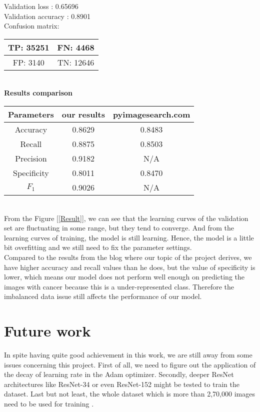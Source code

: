 \documentclass[10 pt]{report}
\begin{document}
\noindent
Validation loss : 0.65696\\
Validation accuracy : 0.8901\\

\noindent
Confusion matrix:\\
\noindent
\begin{tabular}{|c|c|}
\hline
TP: 35251 &  FN: 4468\\ \hline
FP: 3140 & TN: 12646\\ \hline
\end{tabular} \\


\noindent
\textbf{Results comparison}\\
\begin{tabular}{|c|c|c|}
\hline
Parameters & our results & pyimagesearch.com\\ \hline
Accuracy & 0.8629&  0.8483\\ \hline
Recall & 0.8875&  0.8503\\ \hline
Precision  & 0.9182&  N/A\\ \hline
Specificity  & 0.8011&  0.8470\\ \hline
$F_1$  & 0.9026&  N/A\\ \hline
\end{tabular}\\


\vspace{5mm}
\noindent
From the Figure [\ref{Result}],  we can see that the learning curves of the validation set are fluctuating in some range, but they tend to converge. And from the learning curves of training, the model is still learning. Hence, the model is a little bit overfitting and we still need to fix the parameter settings. \\

\noindent
Compared to the results from the blog where our topic of the project derives, we have higher accuracy and recall values than he does, but the value of specificity is lower, which means our model does not perform well enough on predicting the images with cancer because this is a under-represented class. Therefore the imbalanced data issue still affects the performance of our model. 

\section*{Future work}
In spite having quite good achievement in this work, we are still away from some issues concerning this project. First of all, we need to figure out the application of the decay of learning rate in the Adam optimizer. Secondly, deeper ResNet architectures like ResNet-34 or even ResNet-152 might be tested to train the dataset. Last but not least, the whole dataset which is more than 2,70,000 images need to be used for training .
\end{document}
